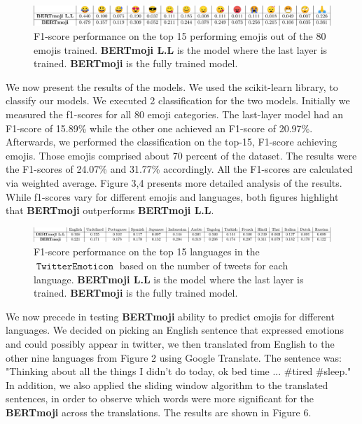 \documentclass[11pt]{article}
\DeclareMathOperator{\emoticon}{\texttt{TwitterEmoticon}}
\begin{document}
\begin{figure}[ht]
    \centering
    \includegraphics[width=\textwidth]{images/TOP15EMOJIPERF.pdf}
    \caption{F1-score performance on the top 15 performing emojis out of the 80 emojis trained. 
    \textbf{BERTmoji L.L} is the model where the last layer is trained. \textbf{BERTmoji} is the fully trained model.}
    \label{fig:tweets_per_day}
\end{figure}

We now present the results of the models. We used the scikit-learn \cite{} library, to classify our models.
We executed 2 classification for the two models. Initially we measured the f1-scores for all 80 emoji categories.
The last-layer model had an F1-score of 15.89\% while the other one achieved an F1-score of 20.97\%. 
Afterwards, we performed the classification on the top-15, F1-score achieving emojis. 
Those emojis comprised about 70 percent of the dataset.
The results were the F1-scores of 24.07\% and 31.77\% accordingly.
All the F1-scores are calculated via weighted average. Figure 3,4 presents more detailed analysis of the results.
While f1-scores vary for different emojis and languages,
both figures highlight that  \textbf{BERTmoji} outperforms \textbf{BERTmoji L.L}. 

\begin{figure}[ht]
    \centering
    \includegraphics[width=\textwidth]{images/TOP15LANGPERF.pdf}
    \caption{F1-score performance on the top 15 languages in the $\emoticon$ based on the number of tweets for each language.
    \textbf{BERTmoji L.L} is the model where the last layer is trained. \textbf{BERTmoji} is the fully trained model.}
    \label{fig:tweets_per_day}
\end{figure}
We now precede in testing \textbf{BERTmoji} ability to predict emojis for different languages.
We decided on picking an English sentence that expressed emotions and could possibly appear in twitter,
we then translated from English to the other nine languages from Figure 2 using Google Translate.
The sentence was: "Thinking about all the things I didn't do today, ok bed time ... \#tired \#sleep."
In addition, we also applied the sliding window algorithm to the translated sentences,
in order to observe which words were more significant for the \textbf{BERTmoji} across the translations.
The results are shown in Figure 6. 
\end{document}
